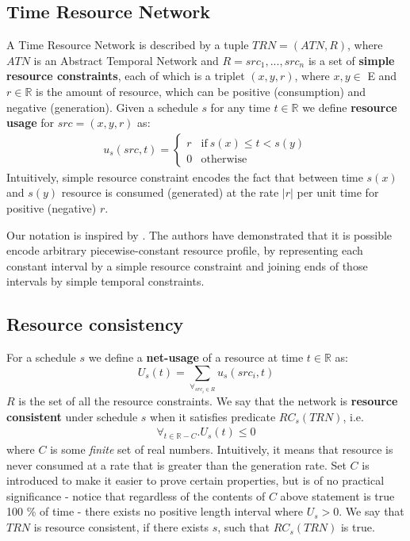 \subsection{Time Resource Network}
\label{sec:trn_definition}
A Time Resource Network is described by a tuple $TRN = (ATN, R)$, where $ATN$ is an Abstract Temporal Network and $R={src_1, ..., src_n}$ is a set of \textbf{simple resource constraints}, each of which is a triplet $(x, y, r)$, where $x, y \in$ E and $r \in \mathbb{R}$ is the amount of resource, which can be positive (consumption) and negative (generation). Given a schedule $s$ for any time $t \in \mathbb{R}$ we define \textbf{resource usage} for $src=(x,y,r)$ as:
\begin{align*}
u_s(src, t) = \begin{cases}
r & \text{if}\ s(x) \leq t < s(y)\\
0 & \text{otherwise}
\end{cases}
\end{align*}
Intuitively, simple resource constraint encodes the fact that between time $s(x)$ and $s(y)$  resource is consumed (generated) at the rate $|r|$ per unit time for positive (negative) $r$.

Our notation is inspired by \cite{bartusch1988scheduling}. The authors have demonstrated that it is possible encode arbitrary piecewise-constant resource profile, by representing each constant interval by a simple resource constraint and joining ends of those intervals by simple temporal constraints.


\subsection{Resource consistency}
For a schedule $s$ we define a \textbf{net-usage} of a resource at time $t \in \mathbb{R}$ as:
\[
U_s(t) = \sum_{\forall_{src_i \in R}} u_s(src_i, t)
\]
$R$ is the set of all the resource constraints. We say that the network is \textbf{resource consistent} under schedule $s$ when it satisfies predicate $RC_s(TRN)$, i.e.
\begin{align}
\label{usage_for_all}\forall_{t \in {\mathbb{R} - C}} . U_s(t) \leq 0
\end{align}
where $C$ is some \textit{finite} set of real numbers. Intuitively, it means that resource is never consumed at a rate that is greater than the generation rate. Set $C$ is introduced to make it easier to prove certain properties, but is of no practical significance - notice that regardless of the contents of $C$ above statement is true 100 \% of time - there exists no positive length interval where $U_s > 0$. We say that $TRN$ is resource consistent, if there exists $s$, such that $RC_s(TRN)$ is true.

